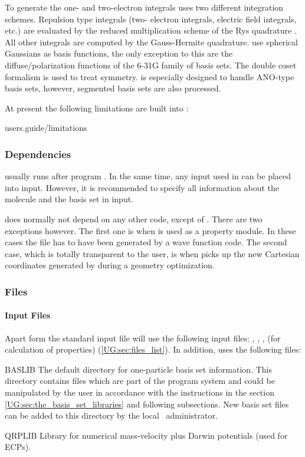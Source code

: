 To generate the one-{} and two-{}electron integrals
 uses two different integration schemes. Repulsion type integrals (two-{}
electron integrals, electric field integrals, etc.) are evaluated by
the reduced multiplication scheme of the Rys quadrature \cite{seward}.
All other integrals are computed by the Gauss-Hermite quadrature.
 use spherical Gaussians as basis functions,
the only exception to this are the diffuse/polarization functions
of the 6-31G family of basis sets.
The double coset \cite{dcf} formalism is used to treat symmetry.
 is especially designed to handle ANO-{}type basis sets, however, segmented basis
sets are also processed.

At present the following limitations are built into :

 {users.guide/limitations}

\subsubsection{Dependencies}
\label{UG:sec:seward_dependencies}
 usually runs after program . In the same time, any input used
in  can be placed into  input. However, it is recommended to
specify all information about the molecule and the basis set in  input.

 does normally not depend on any other code, except of .
There are two exceptions however.
The first one is when  is used as a property module. In these cases the file
 has to have been generated by a wave function code. The second case, which is
totally transparent to the user, is when  picks up the new Cartesian coordinates
generated by  during a geometry optimization.


\subsubsection{Files}
\label{UG:sec:seward_files}
\paragraph{Input Files}

Apart form the standard input file
 will use the following input files: , ,
,  (for calculation of properties) (\ref{UG:sec:files_list}).
In addition,  uses the following files:
\begin{filelist}
\item[BASLIB]
The default directory for one-particle basis set information.
This directory contains files which are part
of the program system and could
be manipulated by the user in accordance with the instructions in the
section \ref{UG:sec:the_basis_set_libraries} and following subsections.
New basis set files can be added to this directory by the local
\molcas\ administrator.
\item[QRPLIB]
Library for numerical mass-velocity plus Darwin potentials (used for ECPs).
\end{filelist}

